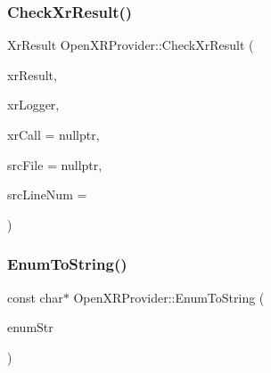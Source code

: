 \mbox{\label{namespace_open_x_r_provider_a9e6665bb283f00adb11c3c4ee57c05dd}} 
\subsubsection{\texorpdfstring{CheckXrResult()}{CheckXrResult()}\hspace{0.1cm}{\footnotesize\ttfamily [2/2]}}
{\footnotesize\ttfamily Xr\+Result Open\+X\+R\+Provider\+::\+Check\+Xr\+Result (\begin{DoxyParamCaption}\item[{Xr\+Result}]{xr\+Result,  }\item[{std\+::shared\+\_\+ptr$<$ spdlog\+::logger $>$}]{xr\+Logger,  }\item[{const char $\ast$}]{xr\+Call = {\ttfamily nullptr},  }\item[{const char $\ast$}]{src\+File = {\ttfamily nullptr},  }\item[{int}]{src\+Line\+Num = {} }\end{DoxyParamCaption})\hspace{0.3cm}{\ttfamily [inline]}}

\mbox{\label{namespace_open_x_r_provider_a9d83a2b1a5d6649210b47ab49a592b47}} 
\subsubsection{\texorpdfstring{EnumToString()}{EnumToString()}}
{\footnotesize\ttfamily const char$\ast$ Open\+X\+R\+Provider\+::\+Enum\+To\+String (\begin{DoxyParamCaption}\item[{const char $\ast$}]{enum\+Str }\end{DoxyParamCaption})\hspace{0.3cm}{\ttfamily [inline]}}

